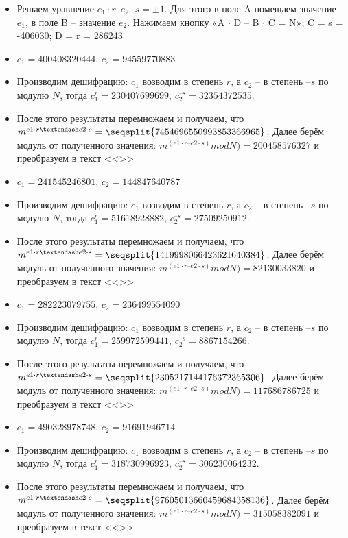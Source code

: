 \begin{itemize}
\item Решаем уравнение $e_1 \cdot r – e_2 \cdot s = \pm 1$. Для этого в поле A помещаем значение $e_1$, в поле B – значение $e_2$. Нажимаем кнопку «A $\cdot$ D – B $\cdot$ C = N»; C = s = -406030; D = r = 286243
\item $c_1 = 400408320444$, $c_2=94559770883$
\item Производим дешифрацию: $c_1$ возводим в степень $r$, а $c_2$ – в степень $–s$ по модулю $N$, тогда $c_1 ^ r = 230407699699$, $c_2 ^{–s} = 32354372535$.
\item После этого результаты перемножаем и получаем, что $m ^ {e1 \cdot r – e2 \cdot s} = \seqsplit{7454696550993853366965}$. Далее берём модуль от полученного значения:  $m ^ {(e1 \cdot r – e2 \cdot s)} mod N) = 200458576327$ и преобразуем в текст <<>>
\item $c_1 = 241545246801$, $c_2=144847640787$
\item Производим дешифрацию: $c_1$ возводим в степень $r$, а $c_2$ – в степень $–s$ по модулю $N$, тогда $c_1 ^ r = 51618928882$, $c_2 ^{–s} = 27509250912$.
\item После этого результаты перемножаем и получаем, что $m ^ {e1 \cdot r – e2 \cdot s} = \seqsplit{1419998066423621640384}$. Далее берём модуль от полученного значения:  $m ^ {(e1 \cdot r – e2 \cdot s)} mod N) = 82130033820$ и преобразуем в текст <<>>
\item $c_1 = 282223079755$, $c_2=236499554090$
\item Производим дешифрацию: $c_1$ возводим в степень $r$, а $c_2$ – в степень $–s$ по модулю $N$, тогда $c_1 ^ r = 259972599441$, $c_2 ^{–s} = 8867154266$.
\item После этого результаты перемножаем и получаем, что $m ^ {e1 \cdot r – e2 \cdot s} = \seqsplit{2305217144176372365306}$. Далее берём модуль от полученного значения:  $m ^ {(e1 \cdot r – e2 \cdot s)} mod N) = 117686786725$ и преобразуем в текст <<>>
\item $c_1 = 490328978748$, $c_2=91691946714$
\item Производим дешифрацию: $c_1$ возводим в степень $r$, а $c_2$ – в степень $–s$ по модулю $N$, тогда $c_1 ^ r = 318730996923$, $c_2 ^{–s} = 306230064232$.
\item После этого результаты перемножаем и получаем, что $m ^ {e1 \cdot r – e2 \cdot s} = \seqsplit{97605013660459684358136}$. Далее берём модуль от полученного значения:  $m ^ {(e1 \cdot r – e2 \cdot s)} mod N) = 315058382091$ и преобразуем в текст <<>>

\end{itemize}
